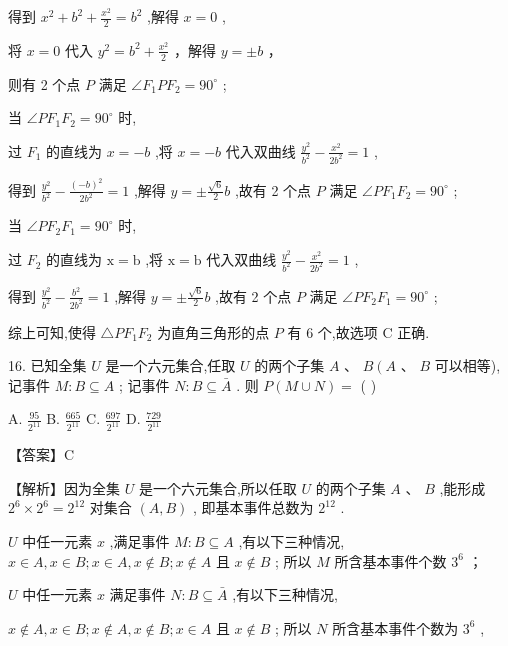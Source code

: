 \documentclass[10pt]{article}
\begin{document}
得到 \({x}^{2} + {b}^{2} + \frac{{x}^{2}}{2} = {b}^{2}\) ,解得 \(x = 0\) ,

将 \(x = 0\) 代入 \({y}^{2} = {b}^{2} + \frac{{x}^{2}}{2}\) ，解得 \(y =  \pm  b\) ，

则有 2 个点 \(P\) 满足 \(\angle {F}_{1}P{F}_{2} = {90}^{ \circ  }\) ;

当 \(\angle P{F}_{1}{F}_{2} = {90}^{ \circ  }\) 时,

过 \({F}_{1}\) 的直线为 \(x =  - b\) ,将 \(x =  - b\) 代入双曲线 \(\frac{{y}^{2}}{{b}^{2}} - \frac{{x}^{2}}{2{b}^{2}} = 1\) ,

得到 \(\frac{{y}^{2}}{{b}^{2}} - \frac{{\left( -b\right) }^{2}}{2{b}^{2}} = 1\) ,解得 \(y =  \pm  \frac{\sqrt{6}}{2}b\) ,故有 2 个点 \(P\) 满足 \(\angle P{F}_{1}{F}_{2} = {90}^{ \circ  }\) ;

当 \(\angle P{F}_{2}{F}_{1} = {90}^{ \circ  }\) 时,

过 \({F}_{2}\) 的直线为 \(\mathrm{x} = \mathrm{b}\) ,将 \(\mathrm{x} = \mathrm{b}\) 代入双曲线 \(\frac{{y}^{2}}{{b}^{2}} - \frac{{x}^{2}}{2{b}^{2}} = 1\) ,

得到 \(\frac{{y}^{2}}{{b}^{2}} - \frac{{b}^{2}}{2{b}^{2}} = 1\) ,解得 \(y =  \pm  \frac{\sqrt{6}}{2}b\) ,故有 2 个点 \(P\) 满足 \(\angle P{F}_{2}{F}_{1} = {90}^{ \circ  }\) ;

综上可知,使得 \(\bigtriangleup P{F}_{1}{F}_{2}\) 为直角三角形的点 \(P\) 有 6 个,故选项 \(\mathrm{C}\) 正确.

16. 已知全集 \(U\) 是一个六元集合,任取 \(U\) 的两个子集 \(A\text{ 、 }B\left( {A\text{ 、 }B}\right.\) 可以相等),记事件 \(M : B \subseteq  A\) ; 记事件 \(N : B \subseteq  \bar{A}\) . 则 \(P\left( {M \cup  N}\right)  =\) (   )

A. \(\frac{95}{{2}^{11}}\) B. \(\frac{665}{{2}^{11}}\) C. \(\frac{697}{{2}^{11}}\) D. \(\frac{729}{{2}^{11}}\)

【答案】C

【解析】因为全集 \(U\) 是一个六元集合,所以任取 \(U\) 的两个子集 \(A\text{ 、 }B\) ,能形成 \({2}^{6} \times  {2}^{6} = {2}^{12}\) 对集合 \(\left( {A,B}\right)\) , 即基本事件总数为 \({2}^{12}\) .

\(U\) 中任一元素 \(x\) ,满足事件 \(M : B \subseteq  A\) ,有以下三种情况, \(x \in  A,x \in  B;x \in  A,x \notin  B;x \notin  A\) 且 \(x \notin  B\) ; 所以 \(M\) 所含基本事件个数 \({3}^{6}\) ；

\(U\) 中任一元素 \(x\) 满足事件 \(N : B \subseteq  \bar{A}\) ,有以下三种情况,

\(x \notin  A,x \in  B;x \notin  A,x \notin  B;x \in  A\) 且 \(x \notin  B\) ; 所以 \(N\) 所含基本事件个数为 \({3}^{6}\) ,
\end{document}
